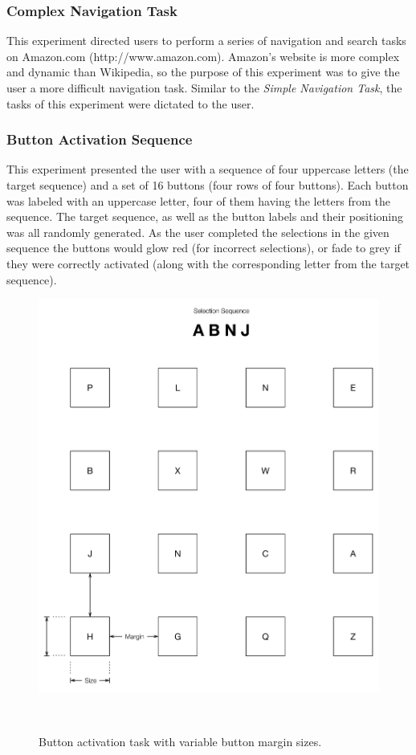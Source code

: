 \documentclass{sigchi}
\begin{document}
\subsubsection{Complex Navigation Task}
This experiment directed users to perform a series of navigation and
search tasks on Amazon.com (http://www.amazon.com). Amazon's website
is more complex and dynamic than Wikipedia, so the purpose of this 
experiment was to give the user a more difficult navigation task.
Similar to the \textit{Simple Navigation Task}, the tasks of this 
experiment were dictated to the user.

\subsubsection{Button Activation Sequence}
This experiment presented the user with a sequence of four uppercase 
letters (the target sequence) and a set of 16 buttons (four rows of 
four buttons). Each button was labeled with an uppercase letter, 
four of them having the letters from the sequence. The target sequence, 
as well as the button labels and their positioning was all randomly 
generated. As the user completed the selections in the given sequence
the buttons would glow red (for incorrect selections), or fade to grey
if they were correctly activated (along with the corresponding 
letter from the target sequence). 

\begin{figure}
\centering
  \includegraphics[width=0.9\columnwidth]{figures/sui.pdf}
  \caption{Button activation task with variable button margin sizes.
  }~\label{fig:sui}
\end{figure}
\end{document}

